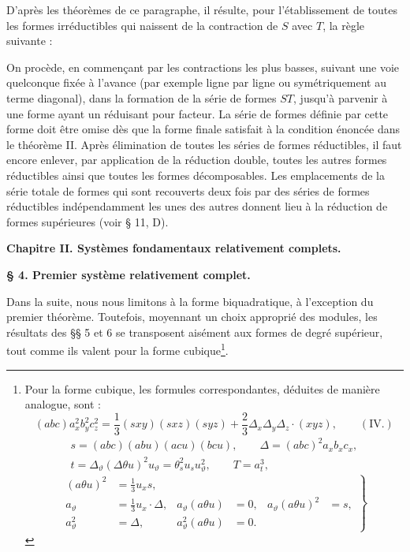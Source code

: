 \documentclass[11pt]{article}
\begin{document}
D'après les théorèmes de ce paragraphe, il résulte, pour l'établissement de toutes les formes irréductibles qui naissent de la contraction de $S$ avec $T$, la règle suivante :

On procède, en commençant par les contractions les plus basses, suivant une voie quelconque fixée à l'avance (par exemple ligne par ligne ou symétriquement au terme diagonal), dans la formation de la série de formes $ST$, jusqu'à parvenir à une forme ayant un réduisant pour facteur. La série de formes définie par cette forme doit être omise dès que la forme finale satisfait à la condition énoncée dans le théorème II. Après élimination de toutes les séries de formes réductibles, il faut encore enlever, par application de la réduction double, toutes les autres formes réductibles ainsi que toutes les formes décomposables. Les emplacements de la série totale de formes qui sont recouverts deux fois par des séries de formes réductibles indépendamment les unes des autres donnent lieu à la réduction de formes supérieures (voir \S{} 11, D).

\begin{center}
\textbf{Chapitre II. \quad Systèmes fondamentaux relativement complets.}

\textbf{\S{} 4. \quad Premier système relativement complet.}
\end{center}

Dans la suite, nous nous limitons à la forme biquadratique, à l'exception du premier théorème. Toutefois, moyennant un choix approprié des modules, les résultats des \S\S{} 5 et 6 se transposent aisément aux formes de degré supérieur, tout comme ils valent pour la forme cubique\footnote{Pour la forme cubique, les formules correspondantes, déduites de manière analogue, sont :
\[
(abc)a_x^2b_y^2c_z^2
=\frac13(sxy)(sxz)(syz)+\frac23\Delta_x\Delta_y\Delta_z\cdot(xyz),
\qquad (\mathrm{IV}.)
\]
\[
\begin{gathered}
s=(abc)(abu)(acu)(bcu),\qquad \Delta=(abc)^2a_xb_xc_x,\\
t=\Delta_\vartheta(\Delta\theta u)^2u_\vartheta
=\theta_s^2u_su_\vartheta^2,
\qquad T=a_t^3,
\end{gathered}
\]
\[
\left.
\begin{aligned}
(a\theta u)^2&=\frac13u_xs,\\
a_\vartheta&=\frac13u_x\cdot\Delta,
&a_\vartheta(a\theta u)&=0,
&a_\vartheta(a\theta u)^2&=s,\\
a_\vartheta^2&=\Delta,
&a_\vartheta^2(a\theta u)&=0.
\end{aligned}
\right\}\tag{1}
\]
}.
\end{document}
